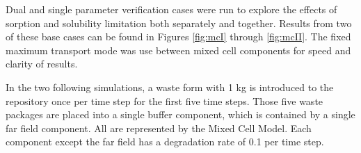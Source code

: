 

Dual and single parameter verification cases were run to explore the effects of 
sorption and solubility limitation both separately and together.  Results from 
two of these base cases can be found in Figures \ref{fig:mcI} through 
\ref{fig:mcII}.
The fixed maximum transport mode was use between mixed cell components for speed 
and clarity of results.

In the two following simulations, a waste form with 1 kg is introduced to the repository once 
per time step for the first five time steps. Those five waste packages are 
placed into a single buffer component, which is contained by a single far field 
component. All are represented by the Mixed Cell Model. Each component except 
the far field has a degradation rate of 0.1 per time step.


\FloatBarrier

